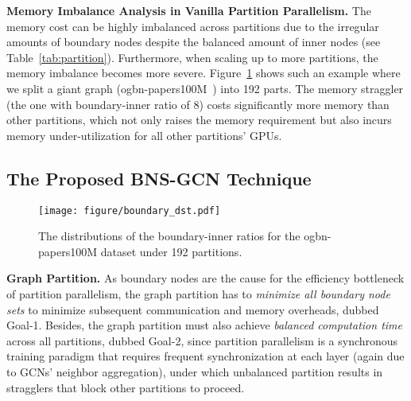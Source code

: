 \documentclass{article}
\newcommand{\niparagraph}[1]{\noindent\textbf{#1}}
\begin{document}
\niparagraph{Memory Imbalance Analysis in Vanilla Partition Parallelism.}
The memory cost can be highly imbalanced across partitions due to the irregular amounts of boundary nodes despite the balanced amount of inner nodes (see Table~\ref{tab:partition}). 
Furthermore, when scaling up to more partitions, the memory imbalance becomes more severe.
Figure~\ref{fig:bd_dist} shows such an example where we split a giant graph (ogbn-papers100M~\citep{hu2020open}) into 192 parts. 
The memory straggler (the one with boundary-inner ratio of 8) costs significantly more memory than other partitions, which not only raises the memory requirement but also incurs memory under-utilization for all other partitions' GPUs.
\subsection{The Proposed BNS-GCN Technique}

\begin{figure}[t]
    \centering
    \texttt{[image: figure/boundary\_dst.pdf]}
        \caption{The distributions of the boundary-inner ratios for the ogbn-papers100M dataset under 192 partitions.}
    \label{fig:bd_dist}
\end{figure}

\label{sec:BNS-GCN}
\niparagraph{Graph Partition.}
As boundary nodes are the cause for the efficiency bottleneck of partition parallelism, the graph partition has to \textit{minimize all boundary node sets} to minimize subsequent communication and memory overheads, dubbed Goal-1. 
Besides, the graph partition must also achieve \textit{balanced computation time} across all partitions, dubbed Goal-2, since partition parallelism is a synchronous training paradigm that requires frequent synchronization at each layer (again due to GCNs' neighbor aggregation), under which unbalanced partition results in stragglers that block other partitions to proceed.
\end{document}
